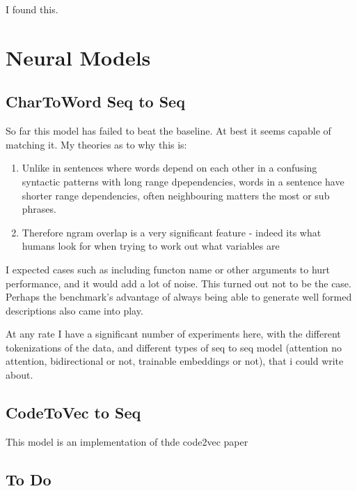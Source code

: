 I found this.



\section{Neural Models} %
\label{sec:neural_models}

\subsection{CharToWord Seq to Seq} %
\label{sub:chartoword_seq_to_seq}

So far this model has failed to beat the baseline. At best it seems capable of matching it. My theories as to why this is:
 \begin{enumerate}
     \item Unlike in sentences where words depend on each other in a confusing syntactic patterns with long range dpependencies, words in a sentence have shorter range dependencies, often neighbouring matters the most or sub phrases.
     \item Therefore ngram overlap is a very significant feature - indeed its what humans look for when trying to work out what variables are
 \end{enumerate}

 I expected cases such as including functon name or other arguments to hurt performance, and it would add a lot of noise. This turned out not to be the case. Perhaps the benchmark's advantage of always being able to generate well formed descriptions also came into play.

 At any rate I have a significant number of experiments here, with the different tokenizations of the data, and different types of seq to seq model (attention no attention, bidirectional or not, trainable embeddings or not), that i could write about.

 \subsection{CodeToVec to Seq} %
 \label{sub:codetovec}

 This model is an implementation of thde code2vec paper 


 \subsection{To Do} %
 \label{sub:to_do}
 
